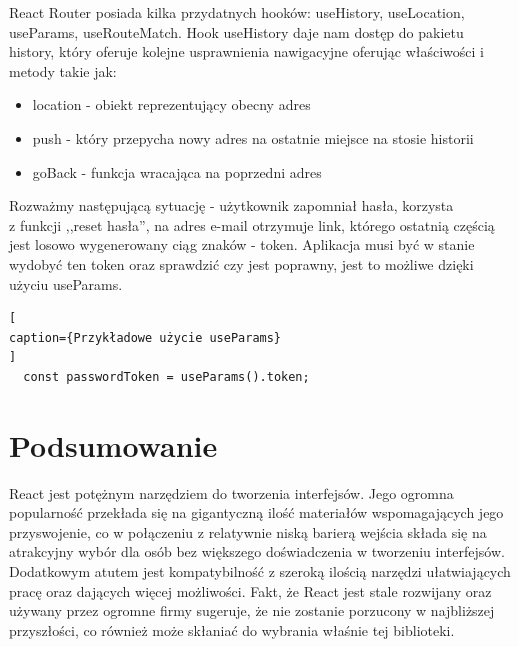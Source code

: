 \documentclass[oneside,polski,logo,indent]{amuthesis}
\begin{document}
React Router posiada kilka przydatnych hooków: useHistory, useLocation, useParams, useRouteMatch. Hook useHistory daje nam dostęp do pakietu history, który oferuje kolejne usprawnienia 
nawigacyjne oferując właściwości i metody takie jak:
\begin{itemize}
\item location - obiekt reprezentujący obecny adres
\item push - który przepycha nowy adres na ostatnie miejsce na stosie historii
\item goBack - funkcja wracająca na poprzedni adres
\end{itemize}
Rozważmy następującą sytuację - użytkownik zapomniał hasła, korzysta \\z funkcji ,,reset hasła'', na adres e-mail otrzymuje link, którego ostatnią częścią
jest losowo wygenerowany ciąg znaków - token. Aplikacja musi być w stanie wydobyć ten token oraz sprawdzić czy jest poprawny, jest to możliwe dzięki użyciu useParams.
\begin{lstlisting}[
caption={Przykładowe użycie useParams}
]
  const passwordToken = useParams().token;

\end{lstlisting}



  
\pagebreak

\section{Podsumowanie}
React jest potężnym narzędziem do tworzenia interfejsów. Jego ogromna popularność przekłada się na gigantyczną ilość materiałów wspomagających jego przyswojenie, co w połączeniu z relatywnie niską barierą wejścia składa się na atrakcyjny wybór dla osób bez większego doświadczenia w tworzeniu interfejsów.
Dodatkowym atutem jest kompatybilność z szeroką ilością narzędzi ułatwiających pracę oraz dających więcej możliwości. Fakt, że React jest stale rozwijany oraz używany przez ogromne firmy
sugeruje, że nie zostanie porzucony w najbliższej przyszłości, co również może skłaniać do wybrania właśnie tej biblioteki.

\nocite{*}


\printbibliography
\end{document}
